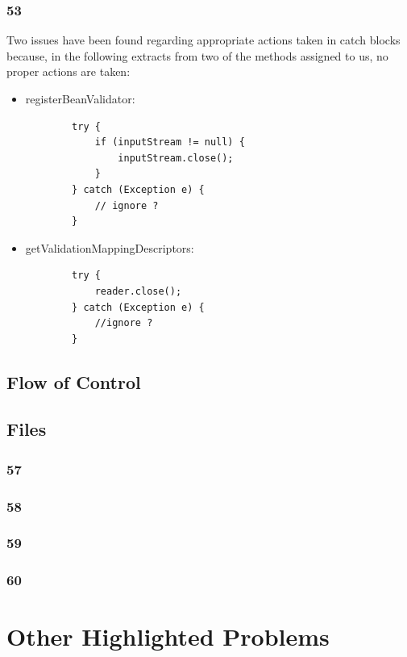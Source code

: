 \documentclass{article}
\begin{document}
\subsubsection{53}
Two issues have been found regarding appropriate actions 
taken in catch blocks because, in the following extracts
from two of the methods assigned to us, no proper actions 
are taken:
\begin{itemize}
	\item registerBeanValidator: \\
	\begin{lstlisting}
		try {
	        if (inputStream != null) {
		        inputStream.close();
	        }
        } catch (Exception e) {
	        // ignore ?
        }
	\end{lstlisting}
	\item getValidationMappingDescriptors: \\
	\begin{lstlisting}
		try {
		    reader.close();
	    } catch (Exception e) {
		    //ignore ?
	    }
	\end{lstlisting}
\end{itemize}
\subsection{Flow of Control}
\subsection{Files} %
\subsubsection{57}
\subsubsection{58}
\subsubsection{59}
\subsubsection{60}

\section{Other Highlighted Problems}
\end{document}

